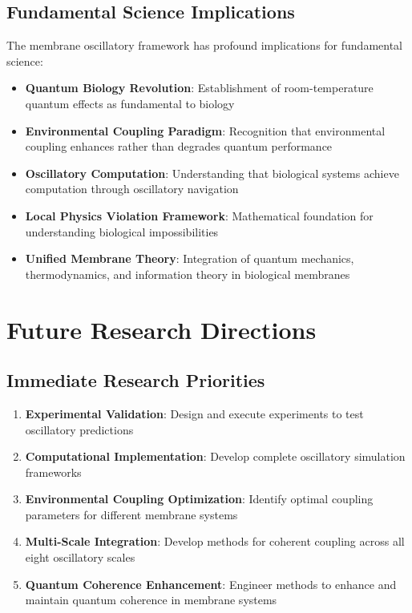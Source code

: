 \documentclass[12pt,a4paper]{article}
\begin{document}
\subsection{Fundamental Science Implications}

The membrane oscillatory framework has profound implications for fundamental science:

\begin{itemize}
\item \textbf{Quantum Biology Revolution}: Establishment of room-temperature quantum effects as fundamental to biology
\item \textbf{Environmental Coupling Paradigm}: Recognition that environmental coupling enhances rather than degrades quantum performance
\item \textbf{Oscillatory Computation}: Understanding that biological systems achieve computation through oscillatory navigation
\item \textbf{Local Physics Violation Framework}: Mathematical foundation for understanding biological impossibilities
\item \textbf{Unified Membrane Theory}: Integration of quantum mechanics, thermodynamics, and information theory in biological membranes
\end{itemize}

\section{Future Research Directions}

\subsection{Immediate Research Priorities}

\begin{enumerate}
\item \textbf{Experimental Validation}: Design and execute experiments to test oscillatory predictions
\item \textbf{Computational Implementation}: Develop complete oscillatory simulation frameworks
\item \textbf{Environmental Coupling Optimization}: Identify optimal coupling parameters for different membrane systems
\item \textbf{Multi-Scale Integration}: Develop methods for coherent coupling across all eight oscillatory scales
\item \textbf{Quantum Coherence Enhancement}: Engineer methods to enhance and maintain quantum coherence in membrane systems
\end{enumerate}
\end{document}
